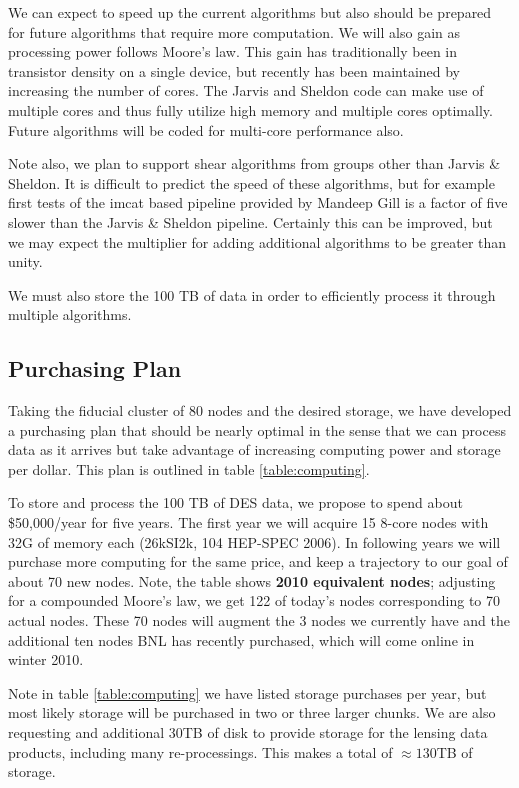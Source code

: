 \documentclass[12pt]{article}
\begin{document}
We can expect to speed up the current algorithms but also should be prepared
for future algorithms that require more computation.  We will also gain as
processing power follows Moore's law. This gain has traditionally been in
transistor density on a single device, but recently has been maintained by
increasing the number of cores.  The Jarvis and Sheldon code can make use of
multiple cores and thus fully utilize high memory and multiple cores optimally.
Future algorithms will be coded for multi-core performance also.

Note also, we plan to support shear algorithms from groups other than Jarvis \&
Sheldon.  It is difficult to predict the speed of these algorithms, but for
example first tests of the imcat based pipeline provided by Mandeep Gill is a
factor of five slower than the Jarvis \& Sheldon pipeline.  Certainly this can
be improved, but we may expect the multiplier for adding additional algorithms
to be greater than unity.

We must also store the 100 TB of data in order to efficiently process it
through multiple algorithms.  


\subsection{Purchasing Plan}

Taking the fiducial cluster of 80 nodes and the desired storage, we have
developed a purchasing plan that should be nearly optimal in the sense that
we can process data as it arrives but take advantage of increasing computing
power and storage per dollar.  This plan is outlined in table \ref{table:computing}.

To store and process the 100 TB of DES data, we propose to spend about
\$50,000/year for five years. The first year we will acquire 15 8-core nodes
with 32G of memory each (26kSI2k, 104 HEP-SPEC 2006).  In following years we
will purchase more computing for the same price, and keep a trajectory to our
goal of about 70 new nodes.  Note, the table shows {\bf 2010 equivalent nodes};
adjusting for a compounded Moore's law, we get 122 of today's nodes
corresponding to 70 actual nodes.  These 70 nodes will augment the 3 nodes we
currently have and the additional ten nodes BNL has recently purchased, which
will come online in winter 2010.

Note in table \ref{table:computing} we have listed storage purchases per year,
but most likely storage will be purchased in two or three larger chunks.  We
are also requesting and additional 30TB of disk to provide storage for the
lensing data products, including many re-processings.  This makes a total
of $\approx 130$TB of storage.
\end{document}
